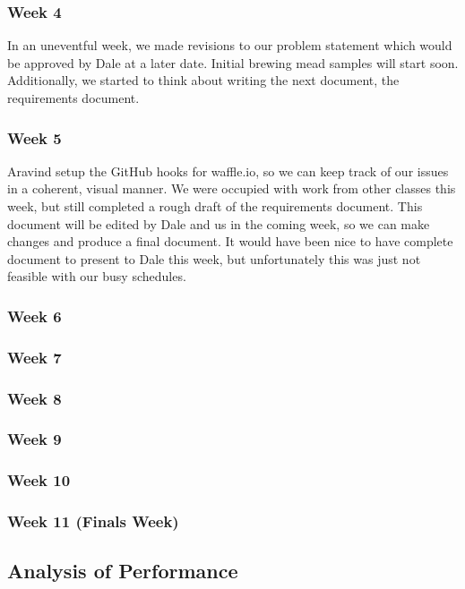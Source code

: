 \documentclass[draftclsnofoot,onecolumn,letterpaper,10pt]{IEEEtran}
\begin{document}
\subsubsection{Week 4} %
In an uneventful week, we made revisions to our problem statement which would be approved by Dale at a later date.
Initial brewing mead samples will start soon.
Additionally, we started to think about writing the next document, the requirements document.

\subsubsection{Week 5} %
Aravind setup the GitHub hooks for waffle.io, so we can keep track of our issues in a coherent, visual manner.
We were occupied with work from other classes this week, but still completed a rough draft of the requirements document.
This document will be edited by Dale and us in the coming week, so we can make changes and produce a final document.
It would have been nice to have complete document to present to Dale this week, but unfortunately this was just not feasible with our busy schedules.

\subsubsection{Week 6}

\subsubsection{Week 7}

\subsubsection{Week 8}

\subsubsection{Week 9}

\subsubsection{Week 10}

\subsubsection{Week 11 (Finals Week)}


\subsection{Analysis of Performance}\label{sec:analysis}
\end{document}
